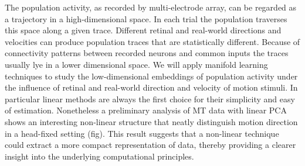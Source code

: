 The population activity, as recorded by multi-electrode array, can be regarded as a trajectory in a high-dimensional space.
In each trial the population traverses this space along a given trace.
Different retinal and real-world directions and velocities can produce population traces that are statistically different.
Because of connectivity patterns between recorded neurons
and common inputs the traces usually lye in a lower dimensional space.
We will apply manifold learning techniques to study the low-dimensional embeddings of population activity under the influence of
retinal and real-world direction and velocity of motion stimuli.
In particular linear methods are always the first choice for their simplicity and easy of estimation. Nonetheless a preliminary analysis
of MT data with linear PCA shows an interesting non-linear structure that neatly distinguish motion direction in a head-fixed setting (fig).
This result suggests that a non-linear technique could extract a more compact representation of data, thereby providing a clearer insight
into the underlying computational principles.
